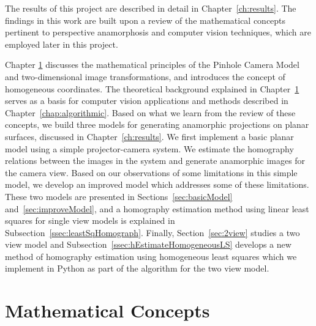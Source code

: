 \documentclass[11pt, oneside, reqno]{book}
\begin{document}
The results of this project are described in detail in Chapter~\ref{ch:results}. The findings in this work are built upon a review of the mathematical concepts pertinent to perspective anamorphosis and computer vision techniques, which are employed later in this project.

Chapter \ref{chap:math} discusses the mathematical principles of the Pinhole Camera Model and two-dimensional image transformations, and introduces the concept of homogeneous coordinates. The theoretical background explained in Chapter~\ref{chap:math} serves as a basis for computer vision applications and methods described in Chapter~\ref{chap:algorithmic}. Based on what we learn from the review of these concepts, we build three models for generating anamorphic projections on planar surfaces, discussed in Chapter~\ref{ch:results}. We first implement a basic planar model using a simple projector-camera system. We estimate the homography relations between the images in the system and generate anamorphic images for the camera view. Based on our observations of some limitations in this simple model, we develop an improved model which addresses some of these limitations. These two models are presented in Sections~\ref{sec:basicModel} and~\ref{sec:improveModel}, and a homography estimation method using linear least squares for single view models is explained in Subsection~\ref{ssec:leastSqHomograph}. Finally, Section~\ref{sec:2view} studies a two view model and Subsection~\ref{ssec:hEstimateHomogeneousLS} develops a new method of homography estimation using homogeneous least squares which we implement in Python as part of the algorithm for the two view model.




















\chapter{Mathematical Concepts}
\label{chap:math}
\end{document}
